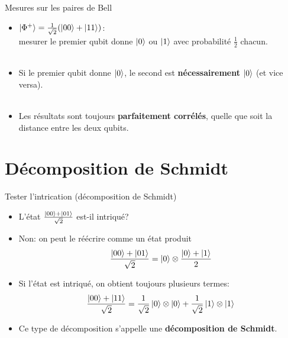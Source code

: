 \documentclass[aspectratio=169,12pt]{beamer}
\begin{document}
\begin{frame}{Mesures sur les paires de Bell}
  \begin{itemize}[<+->]
    \setlength{\itemsep}{0.55em}
    \item $\ket{\Phi^+} = \frac{1}{\sqrt{2}}(\ket{00}+\ket{11})$:\\
     mesurer le premier qubit donne $\ket{0}$ ou $\ket{1}$ avec probabilité $\frac{1}{2}$ chacun.\\~\\
    \item Si le premier qubit donne $\ket{0}$, le second est \textbf{nécessairement} $\ket{0}$ (et vice versa).\\~\\
    \item Les résultats sont toujours \textbf{parfaitement corrélés}, quelle que soit la distance entre les deux qubits.
  \end{itemize}
\end{frame}

\section{Décomposition de Schmidt}

\begin{frame}{Tester l'intrication (décomposition de Schmidt)}
  \begin{itemize}[<+->]
    \item L'état $\frac{\ket{00} + \ket{01}}{\sqrt{2}}$ est-il intriqué? 
    \item Non: on peut le réécrire comme un état produit
    \begin{equation*}
      \frac{\ket{00} + \ket{01}}{\sqrt{2}} = \ket{0} \otimes \frac{\ket{0}+\ket{1}}{2}
    \end{equation*} 
    \item Si l'état est intriqué, on obtient toujours plusieurs termes:
    \begin{equation*}
      \frac{\ket{00} + \ket{11}}{\sqrt{2}} = \frac{1}{\sqrt{2}} \ket{0} \otimes \ket{0} + \frac{1}{\sqrt{2}} \ket{1} \otimes \ket{1}
    \end{equation*}
    \item Ce type de décomposition s'appelle une \textbf{décomposition de Schmidt}.
  \end{itemize}
\end{frame}
\end{document}

